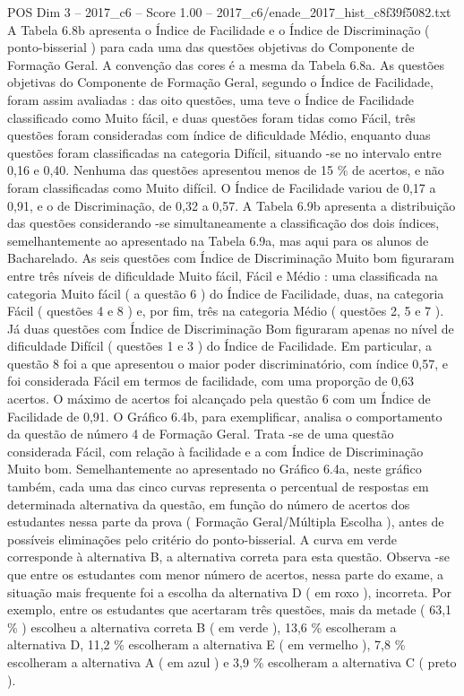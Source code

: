 \begin{textsample}{POS Dim 3 – 2017\_c6 – Score 1.00 – 2017\_c6/enade\_2017\_hist\_c8f39f5082.txt}
A Tabela 6.8b apresenta o Índice de Facilidade e o Índice de Discriminação ( ponto-bisserial ) para cada uma das questões objetivas do Componente de Formação Geral.
A convenção das cores é a mesma da Tabela 6.8a.
As questões objetivas do Componente de Formação Geral, segundo o Índice de Facilidade, foram assim avaliadas : das oito questões, uma teve o Índice de Facilidade classificado como Muito fácil, e duas questões foram tidas como Fácil, três questões foram consideradas com índice de dificuldade Médio, enquanto duas questões foram classificadas na categoria Difícil, situando -se no intervalo entre 0,16 e 0,40.
Nenhuma das questões apresentou menos de 15 \% de acertos, e não foram classificadas como Muito difícil.
O Índice de Facilidade variou de 0,17 a 0,91, e o de Discriminação, de 0,32 a 0,57.
A Tabela 6.9b apresenta a distribuição das questões considerando -se simultaneamente a classificação dos dois índices, semelhantemente ao apresentado na Tabela 6.9a, mas aqui para os alunos de Bacharelado.
As seis questões com Índice de Discriminação Muito bom figuraram entre três níveis de dificuldade Muito fácil, Fácil e Médio : uma classificada na categoria Muito fácil ( a questão 6 ) do Índice de Facilidade, duas, na categoria Fácil ( questões 4 e 8 ) e, por fim, três na categoria Médio ( questões 2, 5 e 7 ).
Já duas questões com Índice de Discriminação Bom figuraram apenas no nível de dificuldade Difícil ( questões 1 e 3 ) do Índice de Facilidade.
Em particular, a questão 8 foi a que apresentou o maior poder discriminatório, com índice 0,57, e foi considerada Fácil em termos de facilidade, com uma proporção de 0,63 acertos.
O máximo de acertos foi alcançado pela questão 6 com um Índice de Facilidade de 0,91.
O Gráfico 6.4b, para exemplificar, analisa o comportamento da questão de número 4 de Formação Geral.
Trata -se de uma questão considerada Fácil, com relação à facilidade e a com Índice de Discriminação Muito bom.
Semelhantemente ao apresentado no Gráfico 6.4a, neste gráfico também, cada uma das cinco curvas representa o percentual de respostas em determinada alternativa da questão, em função do número de acertos dos estudantes nessa parte da prova ( Formação Geral/Múltipla Escolha ), antes de possíveis eliminações pelo critério do ponto-bisserial.
A curva em verde corresponde à alternativa B, a alternativa correta para esta questão.
Observa -se que entre os estudantes com menor número de acertos, nessa parte do exame, a situação mais frequente foi a escolha da alternativa D ( em roxo ), incorreta.
Por exemplo, entre os estudantes que acertaram três questões, mais da metade ( 63,1 \% ) escolheu a alternativa correta B ( em verde ), 13,6 \% escolheram a alternativa D, 11,2 \% escolheram a alternativa E ( em vermelho ), 7,8 \% escolheram a alternativa A ( em azul ) e 3,9 \% escolheram a alternativa C ( preto ).

\end{textsample}
